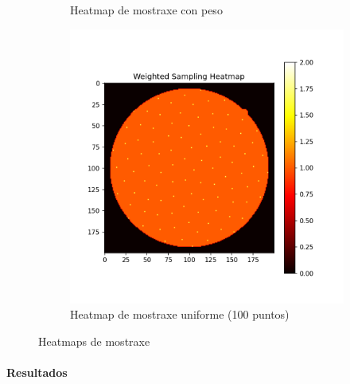 \begin{figure}[]
\begin{subfigure}[b]{0.3\textwidth}
        \caption{Heatmap de mostraxe con peso}
        \label{fig:weighted_sampling_heatmap}
    \end{subfigure}
    \hfill
    \begin{subfigure}[b]{0.3\textwidth}
        \centering
        \includegraphics[width=\textwidth]{imaxes/muestraje/uniform_sampling_heatmap.png}
        \caption{Heatmap de mostraxe uniforme (100 puntos)}
        \label{fig:uniform_sampling_heatmap}
    \end{subfigure}
    \caption{Heatmaps de mostraxe}
    \label{fig:sampling_heatmaps}
\end{figure}


\paragraph{Resultados}
\label{par:Resultados}

